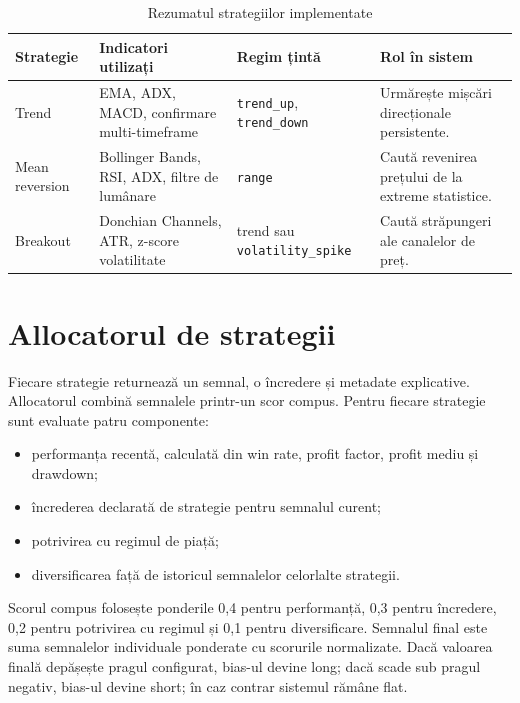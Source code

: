 \begin{table}[H]
    \centering
    \small
    \setlength{\tabcolsep}{4pt}
    \renewcommand{\arraystretch}{1.15}
    \caption{Rezumatul strategiilor implementate}
    \label{tabel:strategii_rezumat}
    \begin{tabular}{|p{2.8cm}|p{4.1cm}|p{3.2cm}|p{3.7cm}|}
        \hline
        \textbf{Strategie} & \textbf{Indicatori utilizați} & \textbf{Regim țintă} & \textbf{Rol în sistem} \\
        \hline
        Trend & EMA, ADX, MACD, confirmare multi-timeframe & \texttt{trend\_up}, \texttt{trend\_down} & Urmărește mișcări direcționale persistente. \\
        \hline
        Mean reversion & Bollinger Bands, RSI, ADX, filtre de lumânare & \texttt{range} & Caută revenirea prețului de la extreme statistice. \\
        \hline
        Breakout & Donchian Channels, ATR, z-score volatilitate & trend sau \texttt{volatility\_spike} & Caută străpungeri ale canalelor de preț. \\
        \hline
    \end{tabular}
    \renewcommand{\arraystretch}{1.0}
\end{table}

\section{Allocatorul de strategii}
\label{cap:cap3:allocator}
\label{sec:allocator}

Fiecare strategie returnează un semnal, o încredere și metadate explicative. Allocatorul combină semnalele printr-un scor compus. Pentru fiecare strategie sunt evaluate patru componente:
\begin{itemize}
    \item performanța recentă, calculată din win rate, profit factor, profit mediu și drawdown;
    \item încrederea declarată de strategie pentru semnalul curent;
    \item potrivirea cu regimul de piață;
    \item diversificarea față de istoricul semnalelor celorlalte strategii.
\end{itemize}

Scorul compus folosește ponderile 0,4 pentru performanță, 0,3 pentru încredere, 0,2 pentru potrivirea cu regimul și 0,1 pentru diversificare. Semnalul final este suma semnalelor individuale ponderate cu scorurile normalizate. Dacă valoarea finală depășește pragul configurat, bias-ul devine long; dacă scade sub pragul negativ, bias-ul devine short; în caz contrar sistemul rămâne flat.

